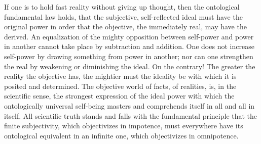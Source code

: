 \documentclass[12pt]{article}
\begin{document}
If one is to hold fast reality without giving up thought, then the
ontological fundamental law holds, that the subjective, self-reflected ideal
must have the original power in order that the objective, the immediately
real, may have the derived. An equalization of the mighty opposition between
self-power and power in another cannot take place by subtraction and
addition. One does not increase self-power by drawing something from power
in another; nor can one strengthen the real by weakening or diminishing the
ideal. On the contrary! The greater the reality the
objective has, the mightier must the ideality be with which it is posited
and determined. The objective world of facts, of realities, is, in the
scientific sense, the strongest expression of the ideal power with which the
ontologically universal self-being masters and comprehends itself in all and
all in itself. All scientific truth stands and falls with the fundamental
principle that the finite subjectivity, which objectivizes in impotence,
must everywhere have its ontological equivalent in an infinite one, which
objectivizes in omnipotence.
\end{document}
